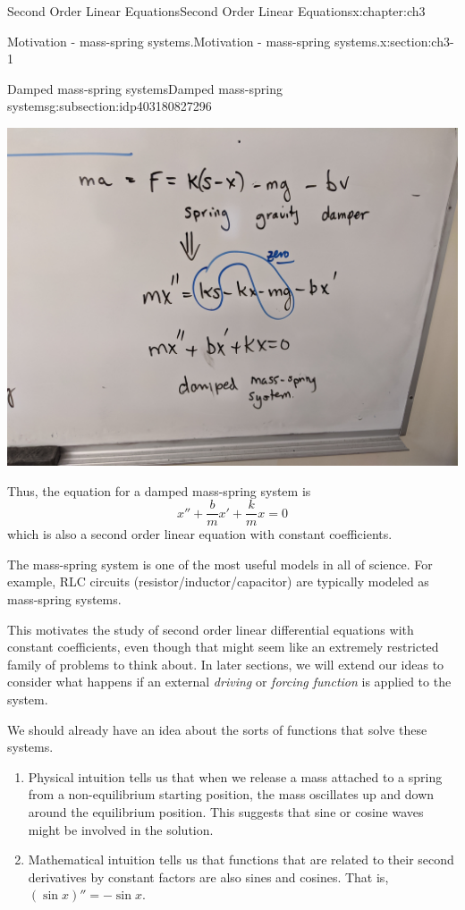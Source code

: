 \documentclass[oneside,10pt,]{book}
\numberwithin{equation}{section}
\numberwithin{equation}{section}
\begin{document}
\begin{chapterptx}{Second Order Linear Equations}{}{Second Order Linear Equations}{}{}{x:chapter:ch3}
\begin{sectionptx}{Motivation - mass-spring systems.}{}{Motivation - mass-spring systems.}{}{}{x:section:ch3-1}
\begin{subsectionptx}{Damped mass-spring systems}{}{Damped mass-spring systems}{}{}{g:subsection:idp403180827296}
\begin{image}{0}{1}{0}
\end{image}%
\begin{image}{0}{1}{0}%
\includegraphics[width=\linewidth]{images/damped3.jpg}
\end{image}%
Thus, the equation for a damped mass-spring system is%
\begin{equation*}
x'' + \frac{b}{m} x' + \frac{k}{m} x = 0
\end{equation*}
which is also a second order linear equation with constant coefficients.%
\par
The mass-spring system is one of the most useful models in all of science. For example, RLC circuits (resistor\slash{}inductor\slash{}capacitor) are typically modeled as mass-spring systems.%
\par
This motivates the study of second order linear differential equations with constant coefficients, even though that might seem like an extremely restricted family of problems to think about. In later sections, we will extend our ideas to consider what happens if an external \emph{driving} or \emph{forcing function} is applied to the system.%
\par
We should already have an idea about the sorts of functions that solve these systems.%
\begin{enumerate}
\item{}Physical intuition tells us that when we release a mass attached to a spring from a non-equilibrium starting position, the mass oscillates up and down around the equilibrium position. This suggests that sine or cosine waves might be involved in the solution.%
\item{}Mathematical intuition tells us that functions that are related to their second derivatives by constant factors are also sines and cosines. That is, \((\sin x)'' = - \sin x\).%

\end{enumerate}
\end{subsectionptx}
\end{sectionptx}
\end{chapterptx}
\end{document}
